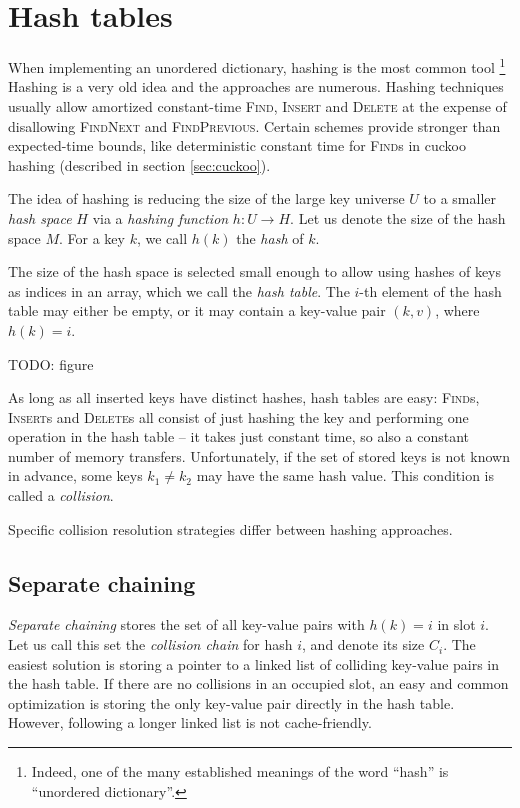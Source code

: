 \chapter{Hash tables}
\label{chapter:hashing}
When implementing an unordered dictionary, hashing is the most common tool
\footnote{Indeed, one of the many established meanings of the word ``hash''
	is ``unordered dictionary''.}
Hashing is a very old idea and the approaches are numerous. Hashing
techniques usually allow amortized constant-time \textsc{Find}, \textsc{Insert}
and \textsc{Delete} at the expense of disallowing \textsc{FindNext} and
\textsc{FindPrevious}. Certain schemes provide stronger than expected-time
bounds, like deterministic constant time for \textsc{Find}s in cuckoo hashing
(described in section \ref{sec:cuckoo}).

The idea of hashing is reducing the size of the large key universe $U$ to
a smaller \emph{hash space} $H$ via a \emph{hashing function}
$h\mathop{:}U\rightarrow H$.
Let us denote the size of the hash space $M$.
For a key $k$, we call $h(k)$ the \emph{hash} of $k$.

The size of the hash space is selected small enough to allow using hashes
of keys as indices in an array, which we call the \emph{hash table}.
The $i$-th element of the hash table may either be empty, or it may contain
a key-value pair $(k,v)$, where $h(k)=i$.

TODO: figure

As long as all inserted keys have distinct hashes, hash tables are easy:
\textsc{Find}s, \textsc{Insert}s and \textsc{Delete}s all consist of just
hashing the key and performing one operation in the hash table -- it takes just
constant time, so also a constant number of memory transfers.
Unfortunately, if the set of stored keys is not known in advance,
some keys $k_1\neq k_2$ may have the same hash value.
This condition is called a \emph{collision}.

Specific collision resolution strategies differ between hashing approaches.

\section{Separate chaining}
\emph{Separate chaining} stores the set of all key-value pairs with
$h(k)=i$ in slot $i$. Let us call this set the \emph{collision chain} for hash
$i$, and denote its size $C_i$. The easiest solution is storing a pointer to
a linked list of colliding key-value pairs in the hash table. If there are no
collisions in an occupied slot, an easy and common optimization is storing
the only key-value pair directly in the hash table. However, following a longer
linked list is not cache-friendly.

